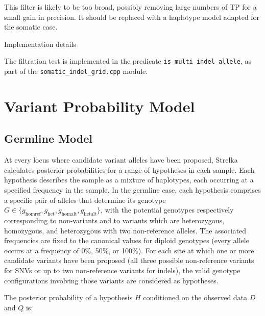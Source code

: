 \documentclass{article}
\newenvironment{raggedParagraph}[1]
{
    \begin{paragraph} {#1}
        \raggedright
    }
    {
    \end{paragraph}
}
\begin{document}
This filter is likely to be too broad, possibly removing large numbers of TP for a small gain in precision. It should be replaced with a haplotype model adapted for the somatic case.

\begin{raggedParagraph}{Implementation details}

The filtration test is implemented in the predicate \verb|is_multi_indel_allele|, as part of the \verb|somatic_indel_grid.cpp| module.

\end{raggedParagraph}

\fi %


\section{Variant Probability Model}
\subsection{Germline Model}
\label{sec:germline}
At every locus where candidate variant alleles have been proposed, Strelka calculates posterior probabilities for a range of hypotheses in each sample. Each hypothesis describes the sample as a mixture of haplotypes, each occurring at a specified frequency in the sample. In the germline case, each hypothesis comprises a specific pair of alleles that determine its genotype $G \in \{ g_\mathrm{homref}, g_\mathrm{het}, g_\mathrm{homalt}, g_\mathrm{hetalt} \}$, with the potential genotypes respectively corresponding to non-variants and to variants which are heterozygous, homozygous, and heterozygous with two non-reference alleles. The associated frequencies are fixed to the canonical values for diploid genotypes (every allele occurs at a frequency of 0\%, 50\%, or 100\%). For each site at which one or more candidate variants have been proposed (all three possible non-reference variants for SNVs or up to two non-reference variants for indels), the valid genotype configurations involving those variants are considered as hypotheses.

The posterior probability of a hypothesis $H$ conditioned on the observed data $D$ and $Q$ is:
\end{document}
